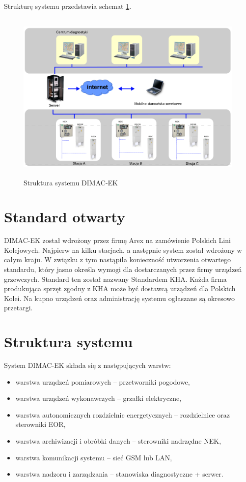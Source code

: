Strukturę systemu przedstawia schemat \ref{fig:dimacek-scheme}.
\begin{figure}[h]
	\includegraphics[height=85mm]{./img/dimacek_struktura.png}
	\caption[Struktura systemu DIMAC-EK]{Struktura systemu DIMAC-EK \cite{arex-materials}}
	\label{fig:dimacek-scheme}
\end{figure}

\section{Standard otwarty}
DIMAC-EK został wdrożony przez firmę Arex na zamówienie Polskich Lini Kolejowych. Najpierw na kilku stacjach, a następnie system został wdrożony w całym kraju. W związku z tym nastąpiła konieczność utworzenia otwartego standardu, który jasno określa wymogi dla dostarczanych przez firmy urządzeń grzewczych. Standard ten został nazwany Standardem KHA\cite{dimacek-wytyczne}. Każda firma produkująca sprzęt zgodny z KHA może być dostawcą urządzeń dla Polskich Kolei. Na kupno urządzeń oraz administrację systemu ogłaszane są okresowo przetargi.

\section{Struktura systemu}
System DIMAC-EK składa się z następujących warstw\cite{dimacek-wytyczne}:
\begin{itemize}
\item warstwa urządzeń pomiarowych -- przetworniki pogodowe,
\item warstwa urządzeń wykonawczych -- grzałki elektryczne,
\item warstwa autonomicznych rozdzielnic energetycznych -- rozdzielnice oraz sterowniki EOR,
\item warstwa archiwizacji i obróbki danych -- sterowniki nadrzędne NEK,
\item warstwa komunikacji systemu -- sieć GSM lub LAN,
\item warstwa nadzoru i zarządzania -- stanowiska diagnostyczne + serwer.
\end{itemize}


